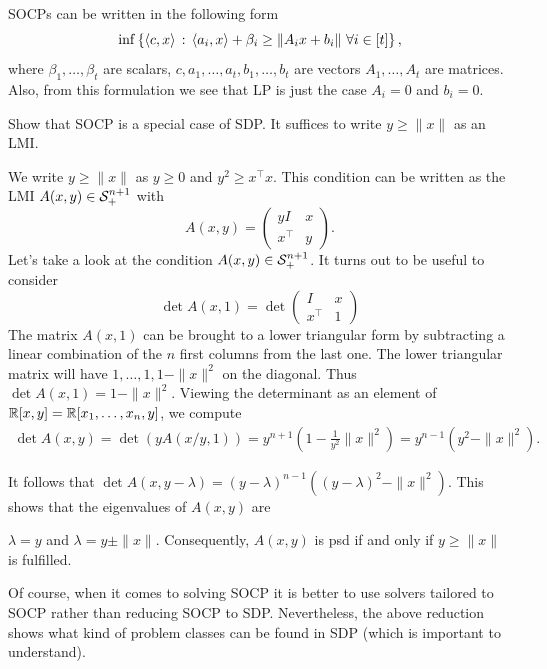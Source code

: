 	SOCPs can be written in the following form 
	\[
		\inf \left\{  \left\langle c , x \right\rangle  \,:\,  \left\langle a_i , x \right\rangle + \beta_i \ge \| A_i x + b_i \| \ \forall i \in [t] \right\},
	\]
	where $\beta_1,\ldots,\beta_t$ are scalars, $c,a_1,\ldots,a_t,b_1,\ldots,b_t$ are vectors  $A_1,\ldots,A_t$ are matrices. Also, from this formulation we see that LP is just the case $A_i=0$ and $b_i=0$.  
	
	\begin{exercise}
	 Show that SOCP is a special case of SDP. It suffices to write  $y \ge  \| x \|$ as an LMI. 
	\end{exercise}
	\begin{solution}
	 We write  $y \ge \| x \|$ as $y \ge 0$ and $y^2 \ge x^\top x$.  This condition can be written as the LMI $A(x,y) \in \mathcal{S}_+^{n+1}$ with
	\[
	A(x,y) = \begin{pmatrix} 
	y I & x
	\\ x^\top & y
	\end{pmatrix}.
	\]
	Let's take a look at the condition $A(x,y) \in \mathcal{S}_+^{n+1}$. It turns out to be useful to consider 
	\[
		\det A(x,1) = \det \begin{pmatrix} 
		 I & x
		\\ x^\top & 1
		\end{pmatrix}
	\]
	The matrix $A(x,1)$ can be brought to a lower triangular form by subtracting a linear combination of the $n$ first columns from the last one. The lower triangular matrix will have $1,\ldots,1, 1- \| x \|^2$ on the diagonal. Thus $\det A(x,1) = 1 - \| x \|^2$. Viewing the determinant as an element of $\mathbb{R}[x,y] = \mathbb{R}[x_1,\ldots,x_n,y]$, we compute
	\begin{align*}
		\det A(x,y) = \det (y A(x/y,1)) = y^{n+1} ( 1 - \frac{1}{y^2} \| x\|^2) = y^{n-1}( y^2  - \|x\|^2). 
	\end{align*}
	
	It follows that $\det A(x,y-\lambda) = (y-\lambda)^{n-1} ((y-\lambda)^2 - \|x\|^2)$. This shows that the eigenvalues of $A(x,y)$ are 
	
	$\lambda = y$ and $\lambda = y \pm \| x \|$. Consequently, $A(x,y)$ is psd if and only if $y \ge \| x \| $ is fulfilled.
	\end{solution}
	
	\begin{remark}
		Of course, when it comes to solving SOCP it is better to use solvers tailored to SOCP rather than reducing SOCP to SDP. Nevertheless, the above reduction shows what kind of problem classes can be found in SDP (which is important to understand). 
	\end{remark}
	
